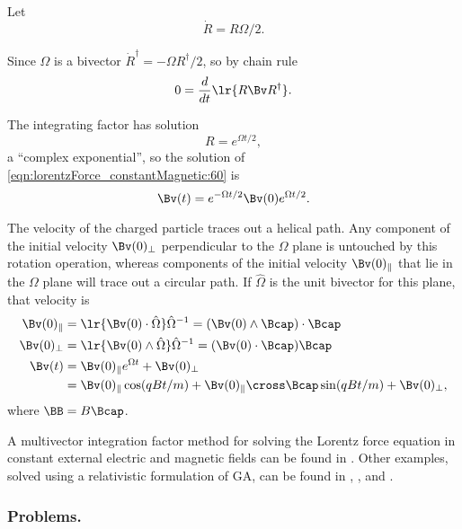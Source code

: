 Let
\begin{equation}\label{eqn:lorentzForce_constantMagnetic:140}
\dot{R} = R \Omega/2.
\end{equation}

Since \( \Omega \) is a bivector \( \dot{R}^\dagger = -\Omega R^\dagger/2 \), so by chain rule
\begin{equation}\label{eqn:lorentzForce_constantMagnetic:160}
0 = \frac{d}{dt} \lr{ R \Bv R^\dagger }.
\end{equation}

The integrating factor has solution
\begin{equation}\label{eqn:lorentzForce_constantMagnetic:180}
R = e^{\Omega t/2},
\end{equation}
a ``complex exponential'', so the solution of \cref{eqn:lorentzForce_constantMagnetic:60} is
\begin{equation}\label{eqn:lorentzForce_constantMagnetic:200}
\Bv(t) = e^{-\Omega t/2} \Bv(0) e^{\Omega t/2}.
\end{equation}

The velocity of the charged particle traces out a helical path.
Any component of the initial velocity \( \Bv(0)_\perp \) perpendicular to the \( \Omega \) plane is untouched by this rotation operation, whereas components of the initial velocity \( \Bv(0)_\parallel \) that lie in the \( \Omega \) plane will trace out a circular path.
If \( \hat{\Omega} \) is the unit bivector for this plane, that velocity is
\begin{equation}\label{eqn:lorentzForce_constantMagnetic:220}
\begin{aligned}
\Bv(0)_\parallel &= \lr{ \Bv(0) \cdot \hat{\Omega} } \hat{\Omega}^{-1}
                  = (\Bv(0) \wedge \Bcap) \cdot \Bcap \\
\Bv(0)_\perp &= \lr{ \Bv(0) \wedge \hat{\Omega} } \hat{\Omega}^{-1}
              = (\Bv(0) \cdot \Bcap) \Bcap \\
\Bv(t) &=
\Bv(0)_\parallel e^{\Omega t} + \Bv(0)_\perp \\
       &=
\Bv(0)_\parallel \cos( q B t/ m )
+
\Bv(0)_\parallel \cross \Bcap \sin( q B t/ m )
+ \Bv(0)_\perp,
\end{aligned}
\end{equation}
where \( \BB = B \Bcap \).

A multivector integration factor method for solving the Lorentz force equation in constant external electric and magnetic fields can be found in \citep{hestenes1999nfc}.  Other examples, solved using a relativistic formulation of GA, can be found in \citep{doran2003gap},
\citep{hestenes1974properdynamics}, and
\citep{hestenes1974propermechanics}.

\subsubsection{Problems.}
